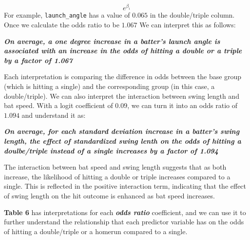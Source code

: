 \documentclass[
  letterpaper,
  DIV=11,
  numbers=noendperiod]{scrartcl}
\begin{document}
\[e^{\beta_i}\] For example, \texttt{launch\_angle} has a value of
\(0.065\) in the double/triple column. Once we calculate the odds ratio
to be \(1.067\) We can interpret this as follows:

\textbf{\emph{On average, a one degree increase in a batter's launch
angle is associated with an increase in the odds of hitting a double or
a triple by a factor of 1.067}}

Each interpretation is comparing the difference in odds between the base
group (which is hitting a single) and the corresponding group (in this
case, a double/triple). We can also interpret the interaction between
swing length and bat speed. With a logit coefficient of \(0.09\), we can
turn it into an odds ratio of \(1.094\) and understand it as:

\textbf{\emph{On average, for each standard deviation increase in a
batter's swing length, the effect of standardized swing lenth on the
odds of hitting a doulbe/triple instead of a single increases by a
factor of 1.094}}

The interaction between bat speed and swing length suggests that as both
increase, the likelihood of hitting a double or triple increases
compared to a single. This is reflected in the positive interaction
term, indicating that the effect of swing length on the hit outcome is
enhanced as bat speed increases.

\textbf{Table 6} has interpretations for each \textbf{\emph{odds ratio}}
coefficient, and we can use it to further understand the relationship
that each predictor variable has on the odds of hitting a double/triple
or a homerun compared to a single.

\newpage
\end{document}
